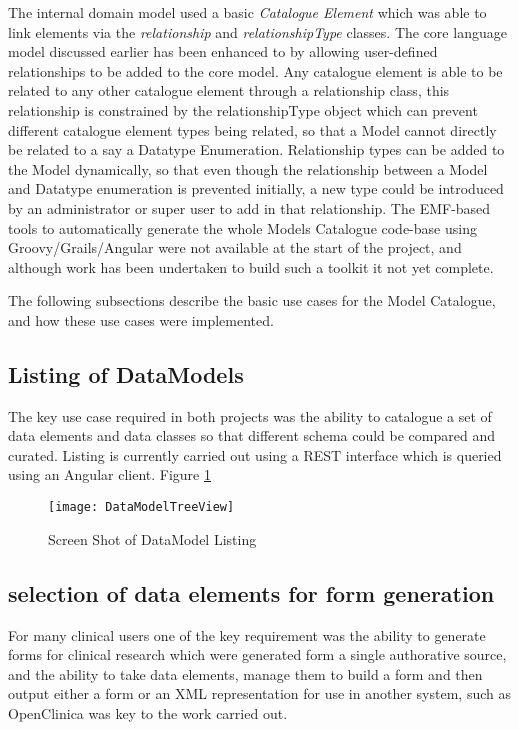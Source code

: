 The internal domain model used a basic \emph{Catalogue Element} which was able to link elements via the \emph{relationship} and \emph{relationshipType} classes. The core language model discussed earlier has been enhanced to by allowing user-defined relationships to be added to the core model. Any catalogue element is able to be related to any other catalogue element through a relationship class, this relationship is constrained by the relationshipType object which can prevent different catalogue element types being related, so that a Model cannot directly be related to a say a Datatype Enumeration. Relationship types can be added to the Model dynamically, so that even though the relationship between a Model and Datatype enumeration is prevented initially, a new type could be introduced by an administrator or super user to add in that relationship. The EMF-based tools to automatically generate the whole Models Catalogue code-base using Groovy/Grails/Angular were not available at the start of the project, and although work has been undertaken to build such a toolkit it not yet complete.  

The following subsections describe the basic use cases for the Model Catalogue, and how these use cases were implemented. 
\subsection{Listing of DataModels}
The key use case required in both projects was the ability to catalogue a set of data elements and data classes so that different schema could be compared and curated. Listing is currently carried out using a REST interface which is queried using an Angular client. Figure \ref{fig:treeviewOfDataModel}
\begin{figure}[here]
	\texttt{[image: DataModelTreeView]}
	\caption{Screen Shot of DataModel Listing} 
	\label{fig:treeviewOfDataModel}	
\end{figure}

\subsection{selection of data elements for form generation}
For many clinical users one of the key requirement was the ability to generate forms for clinical research which were generated form a single authorative source, and the ability to take data elements, manage them to build a form and then output either a form or an XML representation for use in another system, such as OpenClinica was key to the work carried out. 



